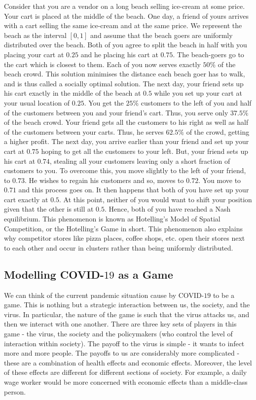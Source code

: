 \documentclass{article}
\theoremstyle{definition}
\begin{document}
Consider that you are a vendor on a long beach selling ice-cream at some price. Your cart is placed at the middle of the beach. One day, a friend of yours arrives with a cart selling the same ice-cream and at the same price. 
We represent the beach as the interval $[0,1]$ and assume that the beach goers are uniformly distributed over the beach. Both of you agree to split the beach in half with you placing your cart at $0.25$ and he placing his cart at $0.75$. The beach-goers go to the cart which is closest to them. Each of you now serves exactly $50 \%$ of the beach crowd. This solution minimises the distance each beach goer has to walk, and is thus called a socially optimal solution. The next day, your friend sets up his cart exactly in the middle of the beach at $0.5$ while you set up your cart at your usual location of $0.25$. You get the $25 \%$ customers to the left of you and half of the customers between you and your friend's cart. Thus, you serve only $37.5 \%$ of the beach crowd. Your friend gets all the customers to his right as well as half of the customers between your carts. Thus, he serves $62.5 \%$ of the crowd, getting a higher profit. The next day, you arrive earlier than your friend and set up your cart at $0.75$ hoping to get all the customers to your left. But, your friend sets up his cart at $0.74$, stealing all your customers leaving only a short fraction of customers to you. To overcome this, you move slightly to the left of your friend, to $0.73$. He wishes to regain his customers and so, moves to $0.72$. You move to $0.71$ and this process goes on. It then happens that both of you have set up your cart exactly at $0.5$. At this point, neither of you would want to shift your position given that the other is still at $0.5$. Hence, both of you have reached a Nash equilibrium. This phenomenon is known as Hotelling's Model of Spatial Competition, or the Hotelling's Game in short. This phenomenon also explains why competitor stores like pizza places, coffee shops, etc. open their stores next to each other and occur in clusters rather than being uniformly distributed. 

\subsection{Modelling COVID-$19$ as a Game}

We can think of the current pandemic situation cause by COVID-$19$ to be a game. This is nothing but a strategic interaction between us, the society, and the virus. In particular, the nature of the game is such that the virus attacks us, and then we interact with one another. There are three key sets of players in this game - the virus, the society and the policymakers (who control the level of interaction within society). The payoff to the virus is simple - it wants to infect more and more people. The payoffs to us are considerably more complicated - these are a combination of health effects and economic effects. Moreover, the level of these effects are different for different sections of society. For example, a daily wage worker would be more concerned with economic effects than a middle-class person. \medskip
\end{document}
